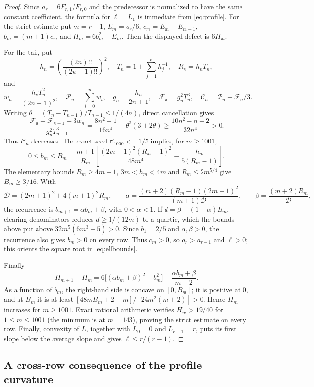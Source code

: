 \documentclass[11pt,a4paper]{article}
\theoremstyle{plain}
\theoremstyle{definition}
\theoremstyle{remark}
\begin{document}
\begin{proof}
Since $a_r=6F_{r,1}/F_{r,0}$ and the predecessor is normalized to have the
same constant coefficient, the formula for $\ell=L_1$ is immediate from
\eqref{eq:profile}. For the strict estimate put $m=r-1$,
$E_m=a_r/6$, $c_m=E_m-E_{m-1}$, $b_m=(m+1)c_m$ and
$H_m=6b_m^2-E_m$. Then the displayed defect is $6H_m$.

For the tail, put
\[
 h_n=\left(\frac{(2n)!!}{(2n-1)!!}\right)^2,
 \quad T_n=1+\sum_{j=1}^n h_j^{-1},
 \quad R_n=h_nT_n,
\]
and
\[
 w_n=\frac{h_nT_n^2}{(2n+1)^2},\quad
 \mathcal P_n=\sum_{i=0}^nw_i,\quad g_n=\frac{h_n}{2n+1},\quad
 \mathcal F_n=g_n^2T_n^3,\quad \mathcal C_n=\mathcal P_n-\mathcal F_n/3.
\]
Writing $\theta=(T_n-T_{n-1})/T_{n-1}\le1/(4n)$, direct cancellation gives
\[
 \frac{\mathcal F_n-\mathcal F_{n-1}-3w_n}
      {g_n^2T_{n-1}^3}
 =\frac{8n^2-1}{16n^4}-\theta^2(3+2\theta)
 \ge\frac{10n^2-n-2}{32n^4}>0.
\]
Thus $\mathcal C_n$ decreases. The exact seed
$\mathcal C_{1000}<-1/5$ implies, for $m\ge1001$,
\[
 0\le b_m\le B_m=\frac{m+1}{R_m}\left[
 \frac{(2m-1)^2(R_m-1)^2}{48m^4}
 -\frac{h_m}{5(R_m-1)}\right].
\]
The elementary bounds $R_m\ge4m+1$, $3m<h_m<4m$ and
$R_m\le2m^{5/4}$ give $B_m\ge3/16$. With
\[
 \mathcal D=(2m+1)^2+4(m+1)^2R_m,\qquad
 \alpha=\frac{(m+2)(R_m-1)(2m+1)^2}{(m+1)\mathcal D},\qquad
 \beta=\frac{(m+2)R_m}{\mathcal D},
\]
the recurrence is $b_{m+1}=\alpha b_m+\beta$, with $0<\alpha<1$. If
$d=\beta-(1-\alpha)B_m$, clearing denominators reduces
$d\ge1/(12m)$ to a quartic, which the bounds above put above
$32m^5(6m^3-5)>0$.
Since $b_1=2/5$ and $\alpha,\beta>0$, the recurrence also gives $b_m>0$ on
every row. Thus $c_m>0$, so $a_r>a_{r-1}$ and $\ell>0$; this orients the
square root in \eqref{eq:ellbounds}.

Finally
\[
 H_{m+1}-H_m
 =6\bigl[(\alpha b_m+\beta)^2-b_m^2\bigr]
  -\frac{\alpha b_m+\beta}{m+2}.
\]
As a function of $b_m$, the right-hand side is concave on $[0,B_m]$; it is
positive at $0$, and at $B_m$ it is at
least $[48mB_m+2-m]/[24m^2(m+2)]>0$. Hence $H_m$ increases for
$m\ge1001$. Exact rational arithmetic verifies $H_m>19/40$ for
$1\le m\le1001$ (the minimum is at $m=143$), proving the strict estimate on
every row. Finally, convexity of $L$, together with $L_0=0$ and
$L_{r-1}=r$, puts its first slope below the average slope and gives
$\ell\le r/(r-1)$.
\end{proof}

\subsection{A cross-row consequence of the profile curvature}
\end{document}
